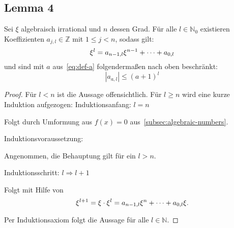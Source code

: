 \subsection{Lemma 4}
    \label{subsec:lemma4}
    \textrm{Sei $\xi$ algebraisch irrational und $n$ dessen Grad. Für alle $l \in \mathbb{N}_0$ existieren
    Koeffizienten $a_{j,l} \in \mathbb{Z}$ mit $1 \leq j < n$, sodass gilt:}
    \begin{equation*}
        \xi^l = a_{n-1, l}\xi^{n-1} + \dots + a_{0,l}
    \end{equation*}
    \textrm{und sind mit $a$ aus~\eqref{eq:def-a} folgendermaßen nach oben beschränkt:}
    \begin{equation*}
        \left| a_{a,l} \right| \leq (a + 1)^l
    \end{equation*}
    \begin{proof}
        \textrm{Für $l < n$ ist die Aussage offensichtlich. Für $l \geq n$ wird eine kurze Induktion aufgezogen:}
        \newpage
        Induktionsanfang: $l = n$
        \begin{indentpar}
            Folgt durch Umformung aus $f(x) = 0$ aus~\ref{subsec:algebraic-numbers}.
        \end{indentpar}
        Induktionsvoraussetzung:
        \begin{indentpar}
            \textrm{Angenommen, die Behauptung gilt für ein $l > n$.}
        \end{indentpar}
        Induktionsschritt: $l \Rightarrow l+1$
        \begin{indentpar}
            Folgt mit Hilfe von
            \begin{equation*}
                \xi^{l+1} = \xi \cdot \xi^l = a_{n-1, l}\xi^{n} + \dots + a_{0,l} \xi.
            \end{equation*}
        \end{indentpar}
        \textrm{Per Induktionsaxiom folgt die Aussage für alle $l \in \mathbb{N}$.}
    \end{proof}

